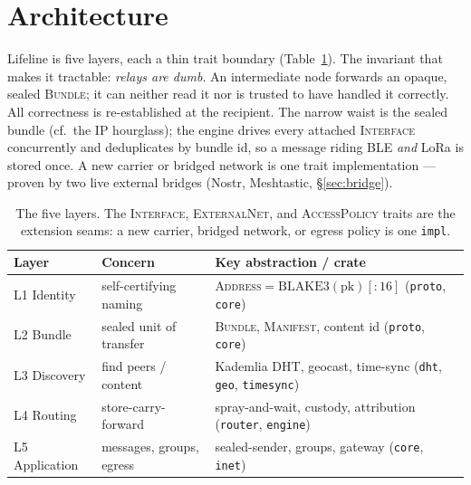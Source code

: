 \documentclass[11pt]{article}
\begin{document}
\section{Architecture}\label{sec:arch}

Lifeline is five layers, each a thin trait boundary (Table~\ref{tab:layers}).
The invariant that makes it tractable: \emph{relays are dumb}. An intermediate
node forwards an opaque, sealed \textsc{Bundle}; it can neither read it nor is
trusted to have handled it correctly. All correctness is re-established at the
recipient. The narrow waist is the sealed bundle (cf.\ the IP hourglass); the
engine drives every attached \textsc{Interface} concurrently and deduplicates by
bundle id, so a message riding BLE \emph{and} LoRa is stored once. A new carrier
or bridged network is one trait implementation --- proven by two live external
bridges (Nostr, Meshtastic, \S\ref{sec:bridge}).

\begin{table}[t]\centering\small
\begin{tabular}{@{}p{2.2cm}p{4.2cm}p{6.4cm}@{}}
\toprule
\textbf{Layer} & \textbf{Concern} & \textbf{Key abstraction / crate}\\
\midrule
L1 Identity & self-certifying naming & \textsc{Address}$=\mathrm{BLAKE3}(\mathrm{pk})[{:}16]$ (\texttt{proto}, \texttt{core})\\
L2 Bundle & sealed unit of transfer & \textsc{Bundle}, \textsc{Manifest}, content id (\texttt{proto}, \texttt{core})\\
L3 Discovery & find peers / content & Kademlia DHT, geocast, time-sync (\texttt{dht}, \texttt{geo}, \texttt{timesync})\\
L4 Routing & store-carry-forward & spray-and-wait, custody, attribution (\texttt{router}, \texttt{engine})\\
L5 Application & messages, groups, egress & sealed-sender, groups, gateway (\texttt{core}, \texttt{inet})\\
\bottomrule
\end{tabular}
\caption{The five layers. The \textsc{Interface}, \textsc{ExternalNet}, and
\textsc{AccessPolicy} traits are the extension seams: a new carrier, bridged
network, or egress policy is one \texttt{impl}.}
\label{tab:layers}
\end{table}

\end{document}
